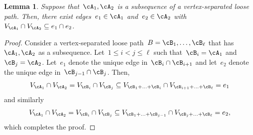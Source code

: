 \documentclass[11pt]{amsart}
\newtheorem{lemma}[algocf]{Lemma}
\theoremstyle{definition}
\numberwithin{equation}{section}
\begin{document}
	\begin{lemma}\label{lemma: connecting edges}
		Suppose that~$\cA_1,\cA_2$ is a subsequence of a vertex-separated loose path.
		Then, there exist edges~$e_1\in\cA_1$ and~$e_2\in\cA_{2}$ with~$V_{\cA_1}\cap V_{\cA_{2}}\subseteq e_1\cap e_{2}$.
	\end{lemma}
	\begin{proof}
		Consider a vertex-separated loose path~$B=\cB_1,\ldots,\cB_{\ell}$ that has~$\cA_1,\cA_2$ as a subsequence.
		Let~$1\leq i<j\leq \ell$ such that~$\cB_{i}=\cA_1$ and~$\cB_{j}=\cA_{2}$.
		Let~$e_{1}$ denote the unique edge in~$\cB_{i}\cap \cB_{i+1}$ and let~$e_{2}$ denote the unique edge in~$\cB_{j-1}\cap \cB_{j}$.
		Then,
		\begin{equation*}
			V_{\cA_1}\cap V_{\cA_{2}}
			=V_{\cB_{i}}\cap V_{\cB_{j}}
			\subseteq V_{\cB_1+\ldots+\cB_{i}}\cap V_{\cB_{i+1}+\ldots+\cB_{\ell}}
			=e_{1}
		\end{equation*}
		and similarly
		\begin{equation*}
			V_{\cA_1}\cap V_{\cA_{2}}
			=V_{\cB_{i}}\cap V_{\cB_{j}}
			\subseteq V_{\cB_1+\ldots+\cB_{j-1}}\cap V_{\cB_{j}+\ldots+\cB_{\ell}}
			=e_{2},
		\end{equation*}
		which completes the proof.
	\end{proof}
	
\end{document}
